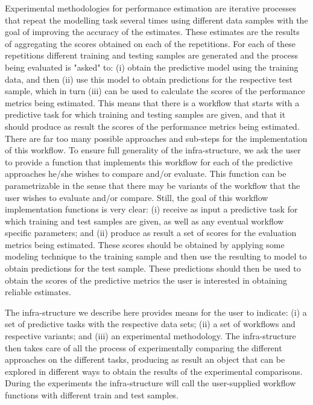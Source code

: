 \documentclass[10pt,a4paper]{article}
\begin{document}
Experimental methodologies for performance estimation are iterative
processes that repeat the modelling task several times using different
data samples with the goal of improving the accuracy of the
estimates. These estimates are the results of aggregating the scores
obtained on each of the repetitions. For each of these
repetitions different training and testing samples are generated and
the process being evaluated is "asked" to: (i) obtain the predictive
model using the training data, and then (ii) use this model to obtain
predictions for the respective test sample, which in turn (iii) can be
used to calculate the scores of the performance metrics being
estimated. This means that there is a workflow that starts with a
predictive task for which training and testing samples are given, and
that it should produce as result the scores of the performance metrics
being estimated. There are far too many possible approaches and
sub-steps for the implementation of this workflow.  To ensure full
generality of the infra-structure, we ask the user to provide a
function that implements this workflow for each of the predictive
approaches he/she wishes to compare and/or evaluate. This function can
be parametrizable in the sense that there may be variants of the
workflow that the user wishes to evaluate and/or compare. Still, the
goal of this workflow implementation functions is very clear: (i)
receive as input a predictive task for which training  and  test
samples are given, as well as any eventual workflow specific parameters; and
(ii) produce as result a set of scores for the evaluation metrics
being estimated. These scores should be obtained by applying some
modeling technique to the training sample and then use the resulting
to model to obtain predictions for the test sample. These predictions
should then be used to obtain the scores of the predictive metrics the
user is interested in obtaining reliable estimates.

The infra-structure we describe here provides means for the user to
indicate: (i) a set of predictive tasks with the respective data sets;
(ii) a set of workflows and respective variants; and (iii) an
experimental methodology. The infra-structure then takes care of all
the process of experimentally comparing the different approaches on
the different tasks, producing as result an object that can be
explored in different ways to obtain the results of the experimental
comparisons. During the experiments the infra-structure will call the
user-supplied workflow functions with different train and test
samples. 
\end{document}
